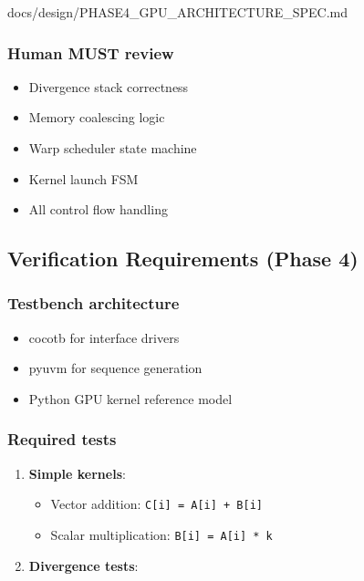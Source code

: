 \begin{relocated}{docs/design/PHASE4_GPU_ARCHITECTURE_SPEC.md}
\subsubsection{Human MUST review}\label{ds:ch:phase4-gpu-architecture:human-must-review}

\begin{itemize}
\tightlist
\item
  Divergence stack correctness
\item
  Memory coalescing logic
\item
  Warp scheduler state machine
\item
  Kernel launch FSM
\item
  All control flow handling
\end{itemize}

\subsection{Verification Requirements (Phase 4)}\label{ds:ch:phase4-gpu-architecture:verification-requirements-phase-4}

\subsubsection{Testbench architecture}\label{ds:ch:phase4-gpu-architecture:testbench-architecture}

\begin{itemize}
\tightlist
\item
  cocotb for interface drivers
\item
  pyuvm for sequence generation
\item
  Python GPU kernel reference model
\end{itemize}

\subsubsection{Required tests}\label{ds:ch:phase4-gpu-architecture:required-tests}

\begin{enumerate}
\def\labelenumi{\arabic{enumi}.}
\item
  \textbf{Simple kernels}:

  \begin{itemize}
  \tightlist
  \item
    Vector addition:
    \texttt{C[i]\ =\allowbreak{}\ A[i]\ +\allowbreak{}\ B[i]}
  \item
    Scalar multiplication: \texttt{B[i]\ =\allowbreak{}\ A[i]\ *\ k}
  \end{itemize}
\item
  \textbf{Divergence tests}:


\end{enumerate}
\end{relocated}
